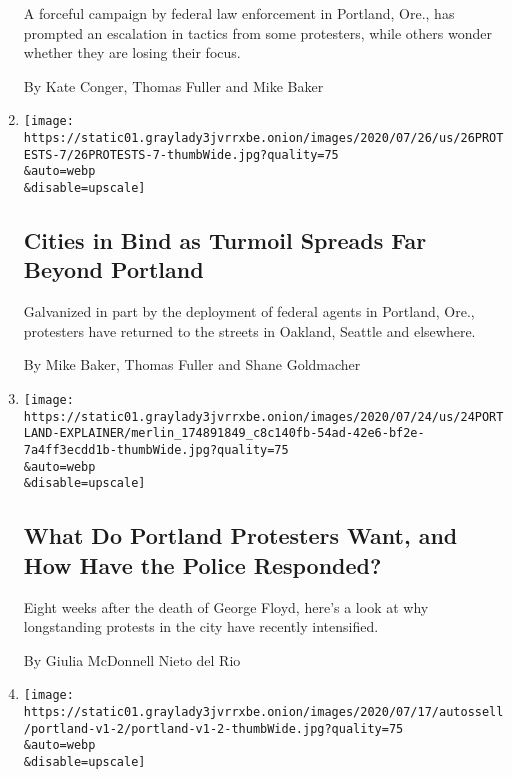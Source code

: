 \begin{enumerate}
  A forceful campaign by federal law enforcement in Portland, Ore., has
  prompted an escalation in tactics from some protesters, while others
  wonder whether they are losing their focus.

  By Kate Conger, Thomas Fuller and Mike Baker
\item
  \href{/2020/07/26/us/protests-portland-seattle-trump.html}{}

  \texttt{[image: https://static01.graylady3jvrrxbe.onion/images/2020/07/26/us/26PROTESTS-7/26PROTESTS-7-thumbWide.jpg?quality=75\\\&auto=webp\\\&disable=upscale]}

  \hypertarget{cities-in-bind-as-turmoil-spreads-far-beyond-portland}{%
  \subsection{Cities in Bind as Turmoil Spreads Far Beyond
  Portland}\label{cities-in-bind-as-turmoil-spreads-far-beyond-portland}}

  Galvanized in part by the deployment of federal agents in Portland,
  Ore., protesters have returned to the streets in Oakland, Seattle and
  elsewhere.

  By Mike Baker, Thomas Fuller and Shane Goldmacher
\item
  \href{/article/portland-protests-explained-protesters.html}{}

  \texttt{[image: https://static01.graylady3jvrrxbe.onion/images/2020/07/24/us/24PORTLAND-EXPLAINER/merlin\_174891849\_c8c140fb-54ad-42e6-bf2e-7a4ff3ecdd1b-thumbWide.jpg?quality=75\\\&auto=webp\\\&disable=upscale]}

  \hypertarget{what-do-portland-protesters-want-and-how-have-the-police-responded}{%
  \subsection{What Do Portland Protesters Want, and How Have the Police
  Responded?}\label{what-do-portland-protesters-want-and-how-have-the-police-responded}}

  Eight weeks after the death of George Floyd, here's a look at why
  longstanding protests in the city have recently intensified.

  By Giulia McDonnell Nieto del Rio
\item
  \href{/2020/07/25/us/portland-federal-legal-jurisdiction-courts.html}{}

  \texttt{[image: https://static01.graylady3jvrrxbe.onion/images/2020/07/17/autossell/portland-v1-2/portland-v1-2-thumbWide.jpg?quality=75\\\&auto=webp\\\&disable=upscale]}


\end{enumerate}
